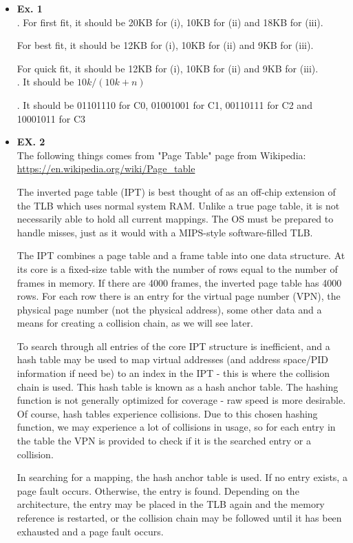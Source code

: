 \documentclass{article}
\begin{document}
\begin{itemize}
\item {\bf Ex. 1}\\
{. For first fit, it should be 20KB for (i), 10KB for (ii) and 18KB for (iii).} 

For best fit, it should be 12KB for (i), 10KB for (ii) and 9KB for (iii).

For quick fit, it should be 12KB for (i), 10KB for (ii) and 9KB for (iii).\\

{. It should be $10k/(10k+n)$\\}

{. It should be 01101110 for C0, 01001001 for C1, 00110111 for C2 and 10001011 for C3\\}

\item {\bf EX. 2}\\
The following things comes from "Page Table" page from Wikipedia: \url{https://en.wikipedia.org/wiki/Page_table}

The inverted page table (IPT) is best thought of as an off-chip extension of the TLB which uses normal system RAM. Unlike a true page table, it is not necessarily able to hold all current mappings. The OS must be prepared to handle misses, just as it would with a MIPS-style software-filled TLB.

The IPT combines a page table and a frame table into one data structure. At its core is a fixed-size table with the number of rows equal to the number of frames in memory. If there are 4000 frames, the inverted page table has 4000 rows. For each row there is an entry for the virtual page number (VPN), the physical page number (not the physical address), some other data and a means for creating a collision chain, as we will see later.

To search through all entries of the core IPT structure is inefficient, and a hash table may be used to map virtual addresses (and address space/PID information if need be) to an index in the IPT - this is where the collision chain is used. This hash table is known as a hash anchor table. The hashing function is not generally optimized for coverage - raw speed is more desirable. Of course, hash tables experience collisions. Due to this chosen hashing function, we may experience a lot of collisions in usage, so for each entry in the table the VPN is provided to check if it is the searched entry or a collision.

In searching for a mapping, the hash anchor table is used. If no entry exists, a page fault occurs. Otherwise, the entry is found. Depending on the architecture, the entry may be placed in the TLB again and the memory reference is restarted, or the collision chain may be followed until it has been exhausted and a page fault occurs.


\end{itemize}
\end{document}
